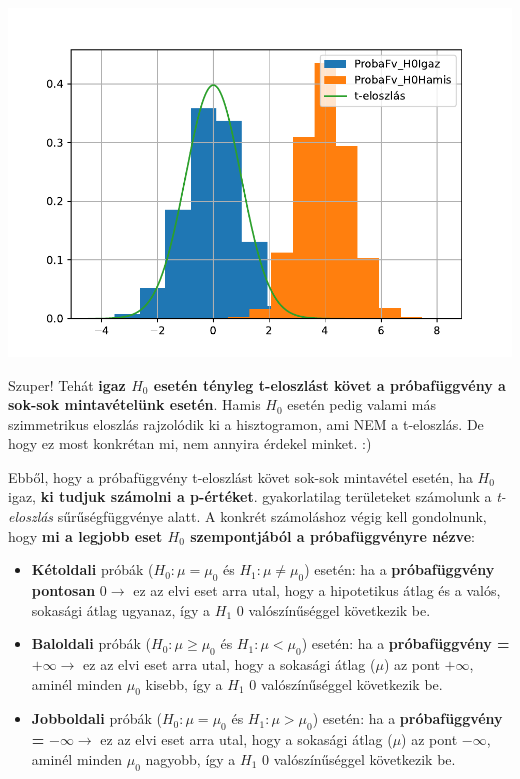 \documentclass[
]{book}
\providecommand{\tightlist}{%
  \setlength{\itemsep}{0pt}\setlength{\parskip}{0pt}}
\begin{document}
\includegraphics{_main_files/figure-latex/unnamed-chunk-340-23.pdf}

Szuper! Tehát \textbf{igaz \(H_0\) esetén tényleg t-eloszlást követ a próbafüggvény a sok-sok mintavételünk esetén}. Hamis \(H_0\) esetén pedig valami más szimmetrikus eloszlás rajzolódik ki a hisztogramon, ami NEM a t-eloszlás. De hogy ez most konkrétan mi, nem annyira érdekel minket. :)

Ebből, hogy a próbafüggvény t-eloszlást követ sok-sok mintavétel esetén, ha \(H_0\) igaz, \textbf{ki tudjuk számolni a p-értéket}. gyakorlatilag területeket számolunk a \emph{t-eloszlás} sűrűségfüggvénye alatt. A konkrét számoláshoz végig kell gondolnunk, hogy \textbf{mi a legjobb eset \(H_0\) szempontjából a próbafüggvényre nézve}:

\begin{itemize}
\tightlist
\item
  \textbf{Kétoldali} próbák (\(H_0: \mu=\mu_0\) és \(H_1: \mu \neq \mu_0\)) esetén: ha a \textbf{próbafüggvény pontosan} \(0 \rightarrow\) ez az elvi eset arra utal, hogy a hipotetikus átlag és a valós, sokasági átlag ugyanaz, így a \(H_1\) \(0\) valószínűséggel következik be.
\item
  \textbf{Baloldali} próbák (\(H_0: \mu\geq\mu_0\) és \(H_1: \mu < \mu_0\)) esetén: ha a \textbf{próbafüggvény =} \(+\infty \rightarrow\) ez az elvi eset arra utal, hogy a sokasági átlag (\(\mu\)) az pont \(+\infty\), aminél minden \(\mu_0\) kisebb, így a \(H_1\) \(0\) valószínűséggel következik be.
\item
  \textbf{Jobboldali} próbák (\(H_0: \mu=\mu_0\) és \(H_1: \mu > \mu_0\)) esetén: ha a \textbf{próbafüggvény =} \(-\infty \rightarrow\) ez az elvi eset arra utal, hogy a sokasági átlag (\(\mu\)) az pont \(-\infty\), aminél minden \(\mu_0\) nagyobb, így a \(H_1\) \(0\) valószínűséggel következik be.
\end{itemize}
\end{document}
